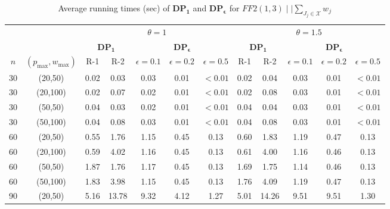 \documentclass[12pt, eqno, limlimits]{article}
\begin{document}
\begin{sloppypar}
        \begin{table}[htpb]
            \footnotesize  
            \setlength{\tabcolsep}{2 pt} %
            \caption{Average running times (sec) of $\mathbf{DP_1}$ and $\mathbf{DP_{\epsilon}}$ for $FF2(1, 3)\mid  \mid \sum_{J_j \in \mathcal{X}} w_j$}  \label{TA-FF13}
            \vspace{-10pt} 
            \begin{center}
                \begin{tabular}{cccccccccccc}  \hline	
                    \multicolumn{2}{c}{} & \multicolumn{5}{c}{$\theta=1$} & \multicolumn{5}{c}{$\theta=1.5$}\\ 
                    \cmidrule(lr){3-7} \cmidrule(lr){8-12}
                    \multicolumn{2}{c}{} & \multicolumn{2}{c}{$\mathbf{DP_1}$} & \multicolumn{3}{c}{$\mathbf{DP_{\epsilon}}$} & \multicolumn{2}{c}{$\mathbf{DP_1}$} & \multicolumn{3}{c}{$\mathbf{DP_{\epsilon}}$} \\ 
                    \cmidrule(lr){3-4} \cmidrule(lr){5-7} \cmidrule(lr){8-9} \cmidrule(lr){10-12}
                    $n$ & $(p_{\max},w_{\max})$&  R-1 &   R-2 & $\epsilon=0.1$ &$\epsilon=0.2$ & $\epsilon=0.5$ & R-1 &   R-2 &$\epsilon=0.1$ &$\epsilon=0.2$ & $\epsilon=0.5$  \\ \hline
                    30 & (20,50)  & 0.02 & 0.03	& 0.03 & 0.01 &	$<0.01$ & 0.02 & 0.04 &	0.03 & 0.01 & $<0.01$  \\ 
                    30 & (20,100) & 0.02 & 0.07	& 0.02 & 0.01 &	$<0.01$ & 0.02 & 0.08 &	0.03 & 0.01 & $<0.01$   \\ 
                    30 & (50,50)  & 0.04 & 0.03	& 0.02 & 0.01 &	$<0.01$ & 0.04 & 0.04 &	0.03 & 0.01	& $<0.01$  \\ 
                    30 & (50,100) & 0.04 & 0.08	& 0.03 & 0.01 &	$<0.01$ & 0.04 & 0.08 &	0.03 & 0.01	& $<0.01$   \\ 
                    60 & (20,50)  & 0.55 & 1.76	& 1.15 & 0.45 &	0.13 & 0.60 & 1.83 & 1.19 & 0.47 & 0.13   \\ 
                    60 & (20,100) & 0.59 & 4.02	& 1.16 & 0.45 &	0.13 & 0.61	& 4.00 & 1.16 &	0.46 & 0.13  \\ 
                    60 & (50,50)  & 1.87 & 1.76	& 1.17 & 0.45 &	0.13 & 1.69	& 1.75 & 1.14 &	0.46 & 0.13   \\ 
                    60 & (50,100) & 1.83 & 3.98	& 1.15 & 0.45 &	0.13 & 1.76	& 4.09 & 1.19 &	0.47 & 0.13   \\ 
                    90 & (20,50)  & 5.16 & 13.78 & 9.32	& 4.12 & 1.27 &	5.01 & 14.26 & 9.51 & 9.51 & 1.30  \\ 

\end{tabular}
\end{center}
\end{table}
\end{sloppypar}
\end{document}
